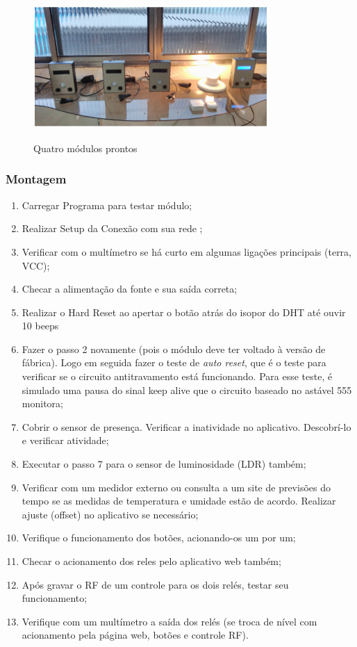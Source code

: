 \begin{enumerate}
	\begin{figure}[H]
		\centering
		\caption{Quatro módulos prontos}
		\includegraphics[width=0.8\textwidth]{QuatroModulos}
		\label{fig:QuatroModulos}
	\end{figure}

\end{enumerate}

\subsubsection {Montagem}
\begin{enumerate}
	\item Carregar Programa para testar módulo;
	\item Realizar Setup da Conexão com sua rede \wwifi;
	\item Verificar com o multímetro se há curto em algumas ligações principais (terra, VCC);
	\item Checar a alimentação da fonte e sua saída correta;
	\item Realizar o Hard Reset ao apertar o botão atrás do isopor do DHT até ouvir 10 beeps
	\item Fazer o passo 2 novamente (pois o módulo deve ter voltado à versão de fábrica). Logo em seguida fazer o teste de \emph{auto reset}, que é o teste para verificar se o circuito antitravamento está funcionando. Para esse teste, é simulado uma pausa do sinal keep alive que o circuito baseado no astável 555 monitora;
	\item Cobrir o sensor de presença. Verificar a inatividade no aplicativo. Descobrí-lo e verificar atividade;
	\item Executar o passo 7 para o sensor de luminosidade (LDR) também;
	\item Verificar com um medidor externo ou consulta a um site de previsões do tempo se as medidas de temperatura e umidade estão de acordo. Realizar ajuste (offset) no aplicativo se necessário;
	\item Verifique o funcionamento dos botões, acionando-os um por um;
	\item Checar o acionamento dos reles pelo aplicativo web também;
	\item Após gravar o RF de um controle para os dois relés, testar seu funcionamento;
	\item Verifique com um multímetro a saída dos relés (se troca de nível com acionamento pela página web, botões e controle RF).
\end{enumerate}
